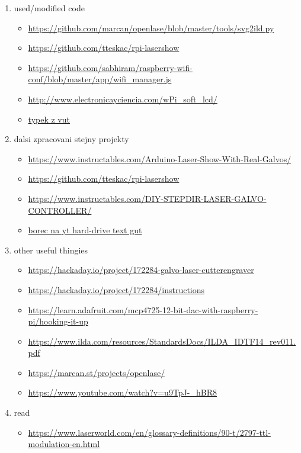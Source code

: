\documentclass{template/socthesis}
\begin{document}
\begin{enumerate}
  \item used/modified code
  \begin{itemize}
    \item \url{https://github.com/marcan/openlase/blob/master/tools/svg2ild.py}
    \item \url{https://github.com/tteskac/rpi-lasershow}
    \item \url{https://github.com/sabhiram/raspberry-wifi-conf/blob/master/app/wifi\_manager.js}
    \item \url{http://www.electronicayciencia.com/wPi\_soft\_lcd/}
    \item \href{https://dspace.vutbr.cz/bitstream/handle/11012/38621/final-thesis.pdf?sequence=-1}{typek z vut}
  \end{itemize}
  \item dalsi zpracovani stejny projekty
  \begin{itemize}
    \item \url{https://www.instructables.com/Arduino-Laser-Show-With-Real-Galvos/}
    \item \url{https://github.com/tteskac/rpi-lasershow}
    \item \url{https://www.instructables.com/DIY-STEPDIR-LASER-GALVO-CONTROLLER/}
    \item \href{https://youtu.be/u9TpJ-_hBR8?si=mHy-UrptZZJ0Xu5-}{borec na yt hard-drive text gut}
  \end{itemize}
  \item other useful thingies
  \begin{itemize}
    \item \url{https://hackaday.io/project/172284-galvo-laser-cutterengraver}

    \item \url{https://hackaday.io/project/172284/instructions}

    \item \url{https://learn.adafruit.com/mcp4725-12-bit-dac-with-raspberry-pi/hooking-it-up}
    \item \url{https://www.ilda.com/resources/StandardsDocs/ILDA\_IDTF14\_rev011.pdf}
    \item \url{https://marcan.st/projects/openlase/}
    \item \url{https://www.youtube.com/watch?v=u9TpJ-\_hBR8}
  \end{itemize}
  \item read
  \begin{itemize}
    \item \url{https://www.laserworld.com/en/glossary-definitions/90-t/2797-ttl-modulation-en.html}
  \end{itemize}

\end{enumerate}
\end{document}

